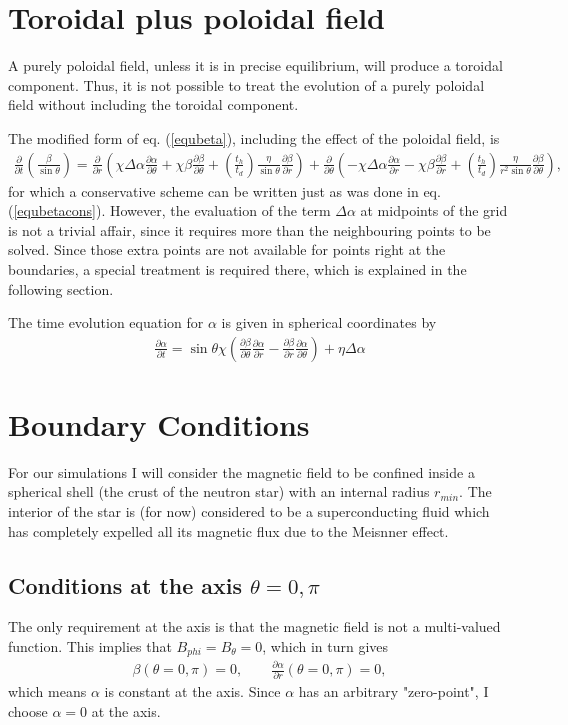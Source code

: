 \documentclass[letterpaper,10pt]{article}
\newcommand{\pp}{\partial}
\begin{document}
\section{Toroidal plus poloidal field}
A purely poloidal field, unless it is in precise equilibrium, will produce a toroidal component. Thus, it is not possible to treat the evolution of a purely poloidal field without including the toroidal component.

The modified form of eq. (\ref{equbeta}), including the effect of the poloidal field, is
\begin{eqnarray}
\frac{\pp}{\pp t}\left(\frac{\beta}{\sin\theta}\right)=\frac{\pp}{\pp r}\left(\chi\Delta\alpha\frac{\pp\alpha}{\pp\theta}+\chi\beta\frac{\pp \beta}{\pp\theta}+\left(\frac{t_h}{t_d}\right)\frac{\eta}{\sin\theta}\frac{\pp\beta}{\pp r}\right)+\frac{\pp}{\pp\theta}\left(-\chi\Delta\alpha\frac{\pp\alpha}{\pp r}-\chi\beta\frac{\pp\beta}{\pp r}+\left(\frac{t_h}{t_d}\right)\frac{\eta}{r^2\sin\theta}\frac{\pp\beta}{\pp\theta}\right),
\end{eqnarray}
for which a conservative scheme can be written just as was done in eq. (\ref{equbetacons}). However, the evaluation of the term $\Delta\alpha$ at midpoints of the grid is not a trivial affair, since it requires more than the neighbouring points to be solved. Since those extra points are not available for points right at the boundaries,  a special treatment is required there, which is explained in the following section.

The time evolution equation for $\alpha$ is given in spherical coordinates by
\begin{eqnarray}
\frac{\pp\alpha}{\pp t}=\sin\theta\chi\left(\frac{\pp\beta}{\pp\theta}\frac{\pp \alpha}{\pp r}-\frac{\pp\beta}{\pp r}\frac{\pp \alpha}{\pp \theta}\right)+\eta\Delta\alpha
\end{eqnarray}
\section{Boundary Conditions}
For our simulations I will consider the magnetic field to be confined inside a spherical shell (the crust of the neutron star) with an internal radius $r_{min}$. The interior of the star is (for now) considered to be a superconducting fluid which has completely expelled all its magnetic flux due to the Meisnner effect.
\subsection{Conditions at the axis $\theta=0,\pi$}
The only requirement at the axis is that the magnetic field is not a multi-valued function. This implies that $B_{phi}=B_{\theta}=0$, which in turn gives
\begin{eqnarray}
\beta(\theta=0,\pi)=0,\qquad \frac{\pp\alpha}{\pp r}(\theta=0,\pi)=0,
\end{eqnarray}
which means $\alpha$ is constant at the axis. Since $\alpha$ has an arbitrary "zero-point", I choose $\alpha=0$ at the axis.
\end{document}
